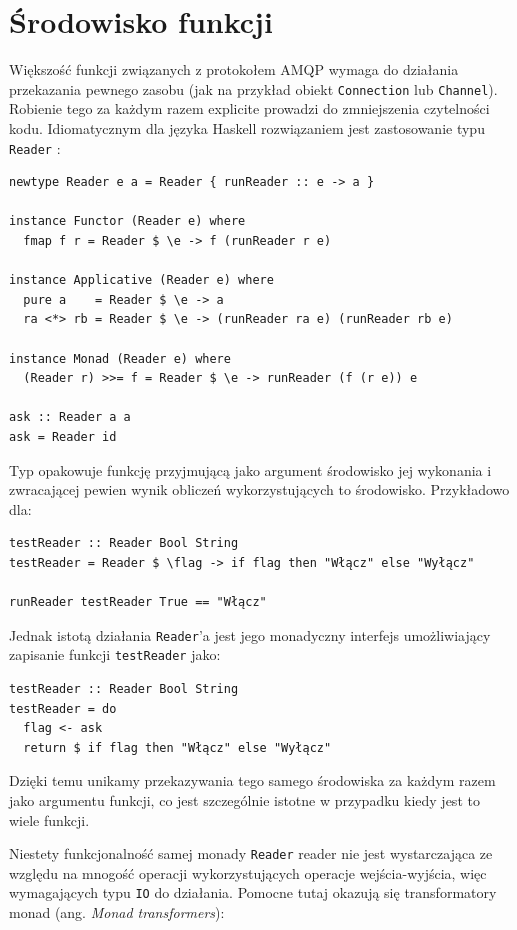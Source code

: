 \section{Środowisko funkcji}
Większość funkcji związanych z protokołem AMQP wymaga do działania przekazania pewnego zasobu (jak na przykład obiekt \lstinline{Connection} lub \lstinline{Channel}). Robienie tego za każdym razem explicite prowadzi do zmniejszenia czytelności kodu. Idiomatycznym dla języka Haskell rozwiązaniem jest zastosowanie typu \lstinline{Reader} \cite{Reader}: 
\begin{lstlisting}[caption=Typ reader]
newtype Reader e a = Reader { runReader :: e -> a }

instance Functor (Reader e) where
  fmap f r = Reader $ \e -> f (runReader r e)

instance Applicative (Reader e) where
  pure a    = Reader $ \e -> a
  ra <*> rb = Reader $ \e -> (runReader ra e) (runReader rb e)

instance Monad (Reader e) where 
  (Reader r) >>= f = Reader $ \e -> runReader (f (r e)) e

ask :: Reader a a
ask = Reader id
\end{lstlisting}

Typ  opakowuje funkcję przyjmującą jako argument środowisko jej wykonania i zwracającej pewien wynik obliczeń wykorzystujących to środowisko. Przykładowo dla:

\begin{lstlisting}
testReader :: Reader Bool String
testReader = Reader $ \flag -> if flag then "Włącz" else "Wyłącz"

runReader testReader True == "Włącz"
\end{lstlisting}

Jednak istotą działania \lstinline{Reader}'a jest jego monadyczny interfejs umożliwiający zapisanie funkcji \lstinline{testReader} jako:

\begin{lstlisting}
testReader :: Reader Bool String
testReader = do
  flag <- ask
  return $ if flag then "Włącz" else "Wyłącz"
\end{lstlisting}

Dzięki temu unikamy przekazywania tego samego środowiska za każdym razem jako argumentu funkcji, co jest szczególnie istotne w przypadku kiedy jest to wiele funkcji.

Niestety funkcjonalność samej monady \lstinline{Reader} reader nie jest wystarczająca ze względu na mnogość operacji wykorzystujących operacje wejścia-wyjścia, więc wymagających typu \lstinline{IO} do działania. Pomocne tutaj okazują się transformatory monad (ang. \textit{Monad transformers}\cite{Transformers}):

